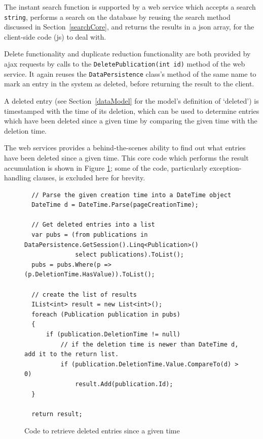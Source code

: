 The instant search function is supported by a web service which accepts a search \texttt{string}, performs a search on the database by reusing the search method discussed in Section~\ref{searchCore}, and returns the results in a \gls{json} array, for the client-side code (\gls{js}) to deal with.  

Delete functionality and duplicate reduction functionality are both provided by \gls{ajax} requests by calls to the \texttt{DeletePublication(int id)} method of the web service.  It again reuses the \texttt{DataPersistence} class's method of the same name to mark an entry in the system as deleted, before returning the result to the client.

A deleted entry (see Section~\ref{dataModel} for the model's definition of `deleted') is timestamped with the time of its deletion, which can be used to determine entries which have been deleted since a given time by comparing the given time with the deletion time. 

The web services provides a behind-the-scenes ability to find out what entries have been deleted since a given time.  This core code which performs the result accumulation is shown in Figure \ref{fig:getDeletedPublicationsWS}; some of the code, particularly exception-handling clauses, is excluded here for brevity.

\begin{figure}
	\begin{center}
			\lstset{language=CSharp} 
			\begin{lstlisting}
  // Parse the given creation time into a DateTime object
  DateTime d = DateTime.Parse(pageCreationTime);

  // Get deleted entries into a list
  var pubs = (from publications in DataPersistence.GetSession().Linq<Publication>()
              select publications).ToList();
  pubs = pubs.Where(p => (p.DeletionTime.HasValue)).ToList();

  // create the list of results
  IList<int> result = new List<int>();
  foreach (Publication publication in pubs)
  {
      if (publication.DeletionTime != null)
          // if the deletion time is newer than DateTime d, add it to the return list.
          if (publication.DeletionTime.Value.CompareTo(d) > 0)
              result.Add(publication.Id);
  }

  return result;
			\end{lstlisting}
		\caption{Code to retrieve deleted entries since a given time}
		\label{fig:getDeletedPublicationsWS}
	\end{center}
\end{figure}

